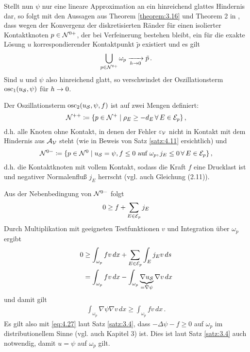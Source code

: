 Stellt nun $\psi$ nur eine lineare Approximation an ein hinreichend glattes Hindernis dar, so folgt mit den Aussagen aus Theorem  \ref{theorem:3.16} und Theorem 2 in \cite{Zhang}, dass wegen der Konvergenz der diskretisierten Ränder für einen isolierter Kontaktknoten $p \in \mathcal N^{0+}$, der bei
Verfeinerung bestehen bleibt, ein für die exakte Lösung $u$ korrespondierender Kontaktpunkt $\tilde p$ existiert und es gilt
\begin{align*}
	\bigcup_{p \in \mathcal N^{0+}} \omega_p \xrightarrow[h\rightarrow 0]{} \tilde p \, .
\end{align*}
Sind $u$ und $\psi$ also hinreichend glatt, so verschwindet der Oszillationsterm $\operatorname{osc}_1(u_{\mathcal S},\psi)$ für $h\rightarrow 0$.


Der Oszillationsterm $\operatorname{osc}_2(u_{\mathcal S}, \psi, f)$ ist auf zwei Mengen definiert:
\begin{align}\label{eq:4.25}
	\mathcal N^{++} \coloneqq \{p \in \mathcal N^{+}\mid \rho_E \ge - d_E \, \forall \, E \in \mathcal E_p\} \, ,
\end{align}
d.h. alle Knoten ohne Kontakt, in denen der Fehler $\varepsilon_{\mathcal V}$ nicht in Kontakt mit dem Hindernis aus $\mathcal A_{\mathcal V}$ steht (wie in Beweis von Satz \ref{satz:4.11} ersichtlich) und
\begin{align}\label{eq:4.26}
	\mathcal N^{0-}\coloneqq \{ p \in \mathcal N^0 \mid u_{\mathcal S} = \psi , f \le 0 \text{ auf } \omega_p, j_E \le 0 \, \forall \, E \in \mathcal E_p \} \, ,
\end{align}
d.h. die Kontaktknoten mit vollem Kontakt, sodass die Kraft $f$ eine Drucklast ist und negativer Normalenfluß $j_E$ herrscht (vgl. auch \cite{SiebVee} Gleichung (2.11)).


Aus der Nebenbedingung von $\mathcal N^{0-}$ folgt
\begin{align*}
	0 \ge f + \sum_{E \in \mathcal E_p} j_E
\end{align*}
Durch Multiplikation mit geeigneten Testfunktionen $v$ und Integration über $\omega_p$ ergibt
\begin{align*}
	0 &  \ge \int_{\omega_p} f v \, dx + \sum_{E\in \mathcal E_p} \int_E j_E v \, ds \\
	& = \int_{\omega_p} f v \, dx - \int_{\omega_p} \underbrace{\nabla u_{\mathcal S}}_{=\nabla \psi} \nabla v \, dx
\end{align*}
und damit gilt
\begin{align}\label{eq:4.27}
	 \int_{\omega_p} {\nabla \psi} \nabla v \, dx \ge \int_{\omega_p} f v \, dx \, .
\end{align}
Es gilt also mit \eqref{eq:4.27} laut Satz \ref{satz:3.4}, dass $-\Delta \psi - f \ge 0$ auf $\omega_p$ im distributionellem Sinne (vgl. auch \cite{Walker} Kapitel 3) ist. Dies ist laut Satz \ref{satz:3.4} auch notwendig, damit $u = \psi$ auf $\omega_p$ gilt.


